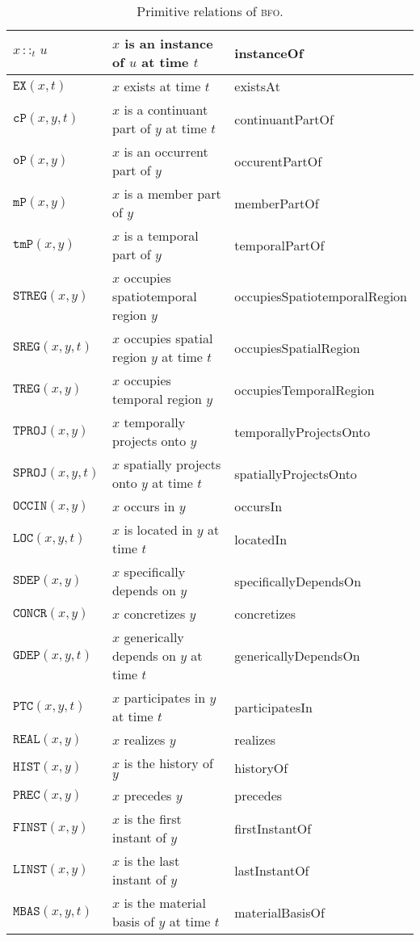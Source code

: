 \documentclass[ao]{iosart2x}
\newcommand{\pr}[1]{\mathtt{#1}}
\newcommand{\bfo}{{\textsc{bfo}}}
\newcommand{\bfocpart}{\pr{cP}}
\newcommand{\bfoopart}{\pr{oP}}
\newcommand{\bfotpart}{\pr{tmP}}
\newcommand{\bfompart}{\pr{mP}}
\newcommand{\bfoexist}{\pr{EX}}
\newcommand{\bfoiof}[1]{{\,::_{#1\:\!}}}
\newcommand{\bfosdep}{\pr{SDEP}}
\newcommand{\bfogdep}{\pr{GDEP}}
\newcommand{\bfooccurs}{\pr{OCCIN}}
\newcommand{\bfolocated}{\pr{LOC}}
\newcommand{\bfosregof}{\pr{SREG}}
\newcommand{\bfotregof}{\pr{TREG}}
\newcommand{\bfostregof}{\pr{STREG}}
\newcommand{\bfoparticin}{\pr{PTC}}
\newcommand{\bfoconcr}{\pr{CONCR}}
\newcommand{\bforealizes}{\pr{REAL}}
\newcommand{\bfotproj}{\pr{TPROJ}}
\newcommand{\bfosproj}{\pr{SPROJ}}
\newcommand{\bfohistory}{\pr{HIST}}
\begin{document}
\begin{table*}
\caption{Primitive relations of {\bfo}.}\label{table_prim_bfo}
\begin{tabular}{|l|l|l|}
\hline
$x \bfoiof{t} u$ & $x$ is an instance of $u$ at time $t$ & instanceOf\\
\hline
$\bfoexist(x,t)$ & $x$ exists at time $t$ & existsAt\\
\hline
$\bfocpart(x,y,t)$ & $x$ is a continuant part of $y$ at time $t$ & continuantPartOf\\
\hline
$\bfoopart(x,y)$ & $x$ is an occurrent part of $y$ & occurentPartOf\\
\hline
$\bfompart(x,y)$ & $x$ is a member part of $y$ & memberPartOf\\
\hline
$\bfotpart(x,y)$ & $x$ is a temporal part of $y$ & temporalPartOf\\
\hline
$\bfostregof(x,y)$ & $x$ occupies spatiotemporal region $y$ & occupiesSpatiotemporalRegion\\
\hline
$\bfosregof(x,y,t)$ & $x$ occupies spatial region $y$ at time $t$ & occupiesSpatialRegion\\
\hline
$\bfotregof(x,y)$ & $x$ occupies temporal region $y$ & occupiesTemporalRegion\\
\hline
$\bfotproj(x,y)$ & $x$ temporally projects onto $y$ & temporallyProjectsOnto\\
\hline
$\bfosproj(x,y,t)$ & $x$ spatially projects onto $y$ at time $t$ & spatiallyProjectsOnto\\
\hline
$\bfooccurs(x,y)$ & $x$ occurs in $y$ & occursIn\\
\hline
$\bfolocated(x,y,t)$ & $x$ is located in $y$ at time $t$ & locatedIn\\
\hline
$\bfosdep(x,y)$ & $x$ specifically depends on $y$ & specificallyDependsOn\\
\hline
$\bfoconcr(x,y)$ & $x$ concretizes $y$ & concretizes\\
\hline
$\bfogdep(x,y,t)$ & $x$ generically depends on $y$ at time $t$ & genericallyDependsOn \\
\hline
$\bfoparticin(x,y,t)$ & $x$ participates in $y$ at time $t$ & participatesIn \\
\hline
$\bforealizes(x,y)$ & $x$ realizes $y$ & realizes\\
\hline
$\bfohistory(x,y)$ & $x$ is the history of $y$ & historyOf \\
\hline
$\pr{PREC}(x,y)$ & $x$ precedes $y$ & precedes\\
\hline
$\pr{FINST}(x,y)$ & $x$ is the first instant of $y$ & firstInstantOf\\
\hline
$\pr{LINST}(x,y)$ & $x$ is the last instant of $y$ & lastInstantOf\\
\hline
$\pr{MBAS}(x,y,t)$ & $x$ is the material basis of $y$ at time $t$ & materialBasisOf\\
\hline
\end{tabular}
\end{table*}
\end{document}
